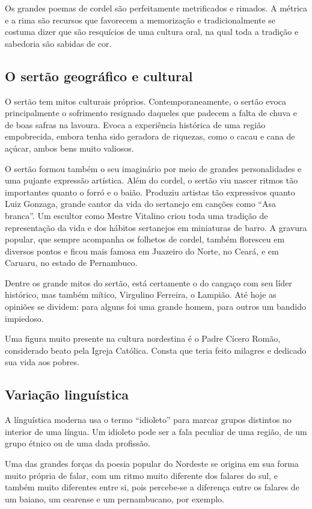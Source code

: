 Os grandes poemas de cordel são perfeitamente metrificados e rimados. A métrica
e a rima são recursos que favorecem a memorização e tradicionalmente se costuma
dizer que são resquícios de uma cultura oral, na qual toda a tradição e
sabedoria são sabidas de cor.  


\subsection{O sertão geográfico e cultural}

O sertão tem mitos culturais próprios. Contemporaneamente, o sertão evoca
principalmente o sofrimento resignado daqueles que padecem a falta de chuva e
de boas safras na lavoura. Evoca a experiência histórica de uma região
empobrecida, embora tenha sido geradora de riquezas, como o cacau e cana de
açúcar, ambos bens muito valiosos. 

O sertão formou também o seu imaginário por meio de grandes personalidades e
uma pujante expressão artística. Além do cordel, o sertão viu nascer ritmos tão
importantes quanto o forró e o baião. Produziu artistas tão expressivos quanto
Luiz Gonzaga, grande cantor da vida do sertanejo em canções como “Asa branca”.
Um escultor como Mestre Vitalino criou toda uma tradição de representação da
vida e dos hábitos sertanejos em miniaturas de barro. A gravura popular, que
sempre acompanha os folhetos de cordel, também floresceu em diversos pontos e
ficou mais famosa em Juazeiro do Norte, no Ceará, e em Caruaru, no estado de
Pernambuco. 

Dentre os grande mitos do sertão, está certamente o do cangaço com seu líder
histórico, mas também mítico, Virgulino Ferreira, o Lampião. Até hoje as
opiniões se dividem: para alguns foi uma grande homem, para outros um bandido
impiedoso. 

Uma figura muito presente na cultura nordestina é o Padre Cícero Romão,
considerado beato pela Igreja Católica. Consta que teria feito milagres e
dedicado sua vida aos pobres. 

\subsection{Variação linguística}

A línguística moderna usa o termo “idioleto” para marcar grupos distintos no
interior de uma língua. Um idioleto pode ser a fala peculiar de uma região, de
um grupo étnico ou de uma dada profissão. 

Uma das grandes forças da poesia popular do Nordeste se origina em sua forma
muito própria de falar, com um ritmo muito diferente dos falares do sul, e
também muito diferentes entre si, pois percebe-se a diferença entre os falares
de um baiano, um cearense e um pernambucano, por exemplo.

